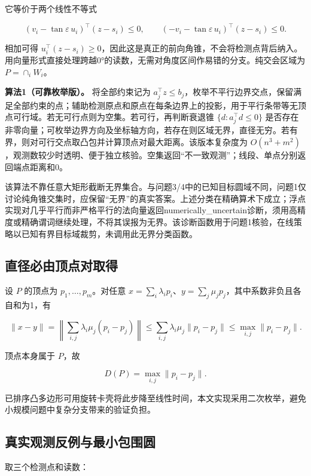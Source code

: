\documentclass[
  chinese,
  UTF8,
  a4paper,
  zihao=-4]{ctexart}
\begin{document}
它等价于两个线性不等式

\[
(v_i-\tan\varepsilon\,u_i)^\top(z-s_i)\le0,\qquad
(-v_i-\tan\varepsilon\,u_i)^\top(z-s_i)\le0. \tag{3}
\]

相加可得
\(u_i^\top(z-s_i)\ge0\)，因此这是真正的前向角锥，不会将检测点背后纳入。用向量形式直接处理跨越0°的读数，无需对角度区间作易错的分支。纯交会区域为
\(P=\cap_iW_i\)。

\textbf{算法1（可靠枚举版）。} 将全部约束记为
\(a_j^\top z\le b_j\)，枚举不平行边界交点，保留满足全部约束的点；辅助检测原点和原点在每条边界上的投影，用于平行条带等无顶点可行域。若无可行点则为空集。若可行，再判断衰退锥
\(\{d:a_j^\top d\le0\}\)
是否存在非零向量；可枚举边界方向及坐标轴方向，若存在则区域无界，直径无穷。若有界，则对可行交点取凸包并计算顶点对最大距离。该版本复杂度为
\(O(n^3+m^2)\)，观测数较少时透明、便于独立核验。空集返回``不一致观测''；线段、单点分别返回端点距离和0。

该算法不靠任意大矩形截断无界集合。与问题3/4中的已知目标圆域不同，问题1仅讨论纯角锥交集时，应保留``无界''的真实答案。上述分类在精确算术下成立；浮点实现对几乎平行而非严格平行的法向量返回numerically\_uncertain诊断，须用高精度或精确谓词继续处理，不将其误报为无界。该诊断函数用于问题1核验，在线策略以已知有界目标域裁剪，未调用此无界分类函数。

\subsection{直径必由顶点对取得}\label{ux76f4ux5f84ux5fc5ux7531ux9876ux70b9ux5bf9ux53d6ux5f97}

设 \(P\) 的顶点为 \(p_1,\ldots,p_m\)。对任意
\(x=\sum_i\lambda_i p_i\)、\(y=\sum_j\mu_jp_j\)，其中系数非负且各自和为1，有

\[
\|x-y\|=\left\|\sum_{i,j}\lambda_i\mu_j(p_i-p_j)\right\|
\le\sum_{i,j}\lambda_i\mu_j\|p_i-p_j\|
\le\max_{i,j}\|p_i-p_j\|.
\]

顶点本身属于 \(P\)，故

\[D(P)=\max_{i,j}\|p_i-p_j\|. \tag{4}\]

已排序凸多边形可用旋转卡壳将此步降至线性时间，本文实现采用二次枚举，避免小规模问题中复杂分支带来的验证负担。

\subsection{真实观测反例与最小包围圆}\label{ux771fux5b9eux89c2ux6d4bux53cdux4f8bux4e0eux6700ux5c0fux5305ux56f4ux5706}

取三个检测点和读数：
\end{document}
